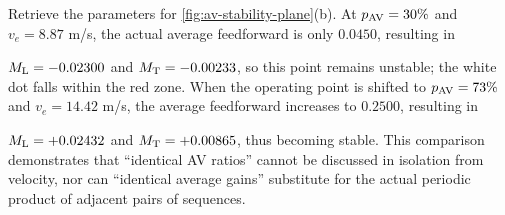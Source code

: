 \documentclass[11pt,a4paper,openany]{book}
\numberwithin{equation}{chapter}
\numberwithin{figure}{chapter}
\numberwithin{table}{chapter}
\begin{document}
\begin{tcolorbox}[experimentbox,title=\textbf{Specific readings on a two-dimensional plane}]

Retrieve the parameters for \ref{fig:av-stability-plane}(b). At $p_{\rm AV}=30\%$ and $v_e=8.87$ m/s, the actual average feedforward is only $0.0450$, resulting in

$M_{\rm L}=-0.02300$ and $M_{\rm T}=-0.00233$, so this point remains unstable; the white dot falls within the red zone. When the operating point is shifted to $p_{\rm AV}=73\%$ and $v_e=14.42$ m/s, the average feedforward increases to $0.2500$, resulting in

$M_{\rm L}=+0.02432$ and $M_{\rm T}=+0.00865$, thus becoming stable. This comparison demonstrates that “identical AV ratios” cannot be discussed in isolation from velocity, nor can “identical average gains” substitute for the actual periodic product of adjacent pairs of sequences.







\end{tcolorbox}
\end{document}
